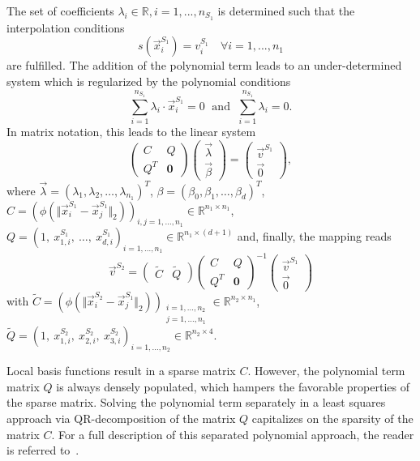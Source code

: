 The set of coefficients $\lambda_{i} \in \mathbb{R}, i=1,...,n_{S_1}$ is determined such that the interpolation conditions
\[
s \left( \vec{x}_{i}^{S_1} \right) = v_{i}^{S_1} \quad \forall i = 1,...,n_1 
\]
are fulfilled. The addition of the polynomial term leads to an under-determined system which is regularized by the polynomial conditions
\[
\sum\limits_{i=1}^{n_{S_1}} \lambda_{i} \cdot \vec{x}_{i}^{S_1} = 0 \; \mbox{ and } \; \sum\limits_{i=1}^{n_{S_1}} \lambda_{i} = 0.
\]
In matrix notation, this leads to the linear system
\[ \left( \begin{array}{cc} C & Q \\ Q^T & \mathbf{0} \end{array} \right) 
   \left( \begin{array}{c} \vec{\lambda} \\ \vec{\beta} \end{array} \right) = 
   \left( \begin{array}{c} \vec{v}^{S_1} \\ \vec{0} \end{array} \right), \]
where $\vec{\lambda} = \left( \lambda_1, \lambda_2, \ldots, \lambda_{n_1} \right)^T$, $\beta = \left(\beta_0, \beta_1, \ldots, \beta_d\right)^T$, $C = \left( \phi \left( \Vert \vec{x}_{i}^{S_1} - \vec{x}_{j}^{S_1} \Vert_{2} \right) \right)_{i,j = 1, \ldots, n_1} \in \mathbb{R}^{n_1 \times n_1}$, $Q = \left( 1,\ x_{1,i}^{S_1},\ \ldots,\ x_{d,i}^{S_1} \right)_{i=1,\ldots,n_1} \in \mathbb{R}^{n_1 \times (d+1)}$
and, finally, the mapping reads
\[ \vec{v}^{S_2}  = \left( \begin{array}{cc} \tilde{C} & \tilde{Q} \end{array} \right) \left( \begin{array}{cc} C & Q \\ Q^T & \mathbf{0} \end{array} \right)^{-1} \left( \begin{array}{c} \vec{v}^{S_1} \\ \vec{0} \end{array} \right) \] 
with $\tilde{C} = \left( \phi \left( \Vert \vec{x}_{i}^{S_2} - \vec{x}_{j}^{S_1} \Vert_{2} \right)\right)_{\substack{i=1,\ldots, n_2 \\ j=1,\ldots,n_1}} \in \mathbb{R}^{n_2 \times n_1}$, 
$\tilde{Q} = \left( 1,\ x_{1,i}^{S_2},\ x_{2,i}^{S_2},\ x_{3,i}^{S_2} \right)_{i=1,\ldots,n_2} \in \mathbb{R}^{n_2 \times 4}$.

Local basis functions result in a sparse matrix $C$. 
However, the polynomial term matrix $Q$ is always densely populated, which hampers the favorable properties of the sparse matrix. Solving the polynomial term separately in a least squares approach via QR-decomposition of the matrix $Q$ capitalizes on the sparsity of the matrix $C$. For a full description of this separated polynomial approach, the reader is referred to~\cite{Lindner2017}.


